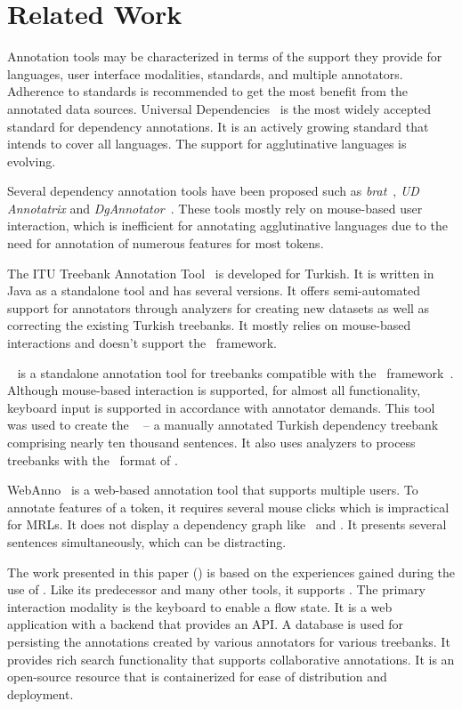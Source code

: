 \section{Related Work}
\label{sec:related}

Annotation tools may be characterized in terms of the support they provide for languages, user interface modalities, standards, and multiple annotators.
Adherence to standards is recommended to get the most benefit from the annotated data sources.
Universal Dependencies~\cite{UD} is the most widely accepted standard for dependency annotations.
It is an actively growing standard that intends to cover all languages.
The support for agglutinative languages is evolving.

Several dependency annotation tools have been proposed such as \textit{brat}~\cite{brat}, \textit{UD Annotatrix} and \textit{DgAnnotator}~\cite{UD-tools}.
These tools mostly rely on mouse-based user interaction, which is inefficient for annotating agglutinative languages due to the need for annotation of numerous features for most tokens.

The ITU Treebank Annotation Tool~\cite{pamay-etal-2015-annotation} is developed for Turkish.
It is written in Java as a standalone tool and has several versions.
It offers semi-automated support for annotators through analyzers for creating new datasets as well as correcting the existing Turkish treebanks.
It mostly relies on mouse-based interactions and doesn't support the \ud\ framework.

\boatvone~\cite{turk-etal-2019-turkish} is a standalone annotation tool for treebanks compatible with the \ud\ framework~\cite{UD}.
Although mouse-based interaction is supported, for almost all functionality, keyboard input is supported in accordance with annotator demands.
This tool was used to create the \bountreebank~\cite{turk2021resources,UD-Boun-Treebank} -- a manually annotated Turkish dependency treebank comprising nearly ten thousand sentences.
It also uses analyzers to process treebanks with the \conllu\ format of \ud.

WebAnno~\cite{webanno} is a web-based annotation tool that supports multiple users.
To annotate features of a token, it requires several mouse clicks which is impractical for MRLs.
It does not display a dependency graph like \boatvone\ and \boatvtwo.
It presents several sentences simultaneously, which can be distracting.

The work presented in this paper (\boatvtwo) is based on the experiences gained during the use of \boatvone.
Like its predecessor and many other tools, it supports \ud.
The primary interaction modality is the keyboard to enable a flow state.
It is a web application with a backend that provides an API.
A database is used for persisting the annotations created by various annotators for various treebanks.
It provides rich search functionality that supports collaborative annotations.
It is an open-source resource that is containerized for ease of distribution and deployment.
